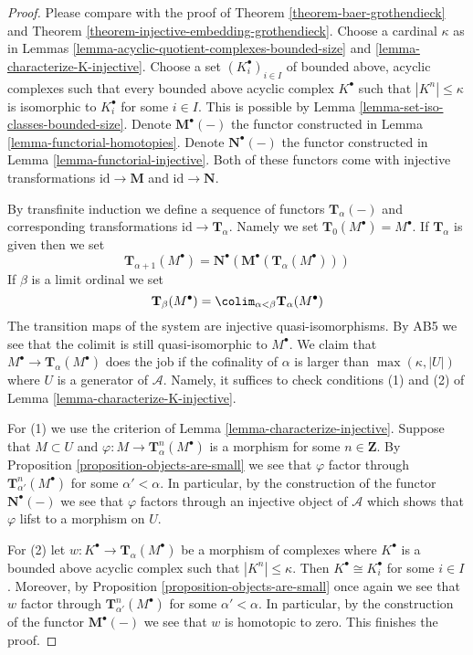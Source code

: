 \begin{proof}
Please compare with the proof of
Theorem \ref{theorem-baer-grothendieck}
and
Theorem \ref{theorem-injective-embedding-grothendieck}.
Choose a cardinal $\kappa$ as in
Lemmas \ref{lemma-acyclic-quotient-complexes-bounded-size} and
\ref{lemma-characterize-K-injective}.
Choose a set $(K_i^\bullet)_{i \in I}$
of bounded above, acyclic complexes
such that every bounded above acyclic complex $K^\bullet$
such that $|K^n| \leq \kappa$ is isomorphic to $K_i^\bullet$ for some
$i \in I$. This is possible by
Lemma \ref{lemma-set-iso-classes-bounded-size}.
Denote $\mathbf{M}^\bullet(-)$ the functor constructed in
Lemma \ref{lemma-functorial-homotopies}.
Denote $\mathbf{N}^\bullet(-)$ the functor constructed in
Lemma \ref{lemma-functorial-injective}.
Both of these functors come with injective transformations
$\text{id} \to \mathbf{M}$ and $\text{id} \to \mathbf{N}$.

\medskip\noindent
By transfinite induction we define a sequence of functors
$\mathbf{T}_\alpha(-)$ and corresponding transformations
$\text{id} \to \mathbf{T}_\alpha$. Namely we set
$\mathbf{T}_0(M^\bullet) = M^\bullet$. If $\mathbf{T}_\alpha$ is
given then we set
$$
\mathbf{T}_{\alpha + 1}(M^\bullet) =
\mathbf{N}^\bullet(\mathbf{M}^\bullet(\mathbf{T}_\alpha(M^\bullet)))
$$
If $\beta$ is a limit ordinal we set
$$
\mathbf{T}_\beta(M^\bullet) =
\colim_{\alpha < \beta} \mathbf{T}_\alpha(M^\bullet)
$$
The transition maps of the system are injective quasi-isomorphisms.
By AB5 we see that the colimit is still quasi-isomorphic to $M^\bullet$.
We claim that $M^\bullet \to \mathbf{T}_\alpha(M^\bullet)$
does the job if the cofinality of $\alpha$ is larger than
$\max(\kappa, |U|)$ where $U$ is a generator of $\mathcal{A}$.
Namely, it suffices to check conditions (1) and (2) of
Lemma \ref{lemma-characterize-K-injective}.

\medskip\noindent
For (1) we use the criterion of
Lemma \ref{lemma-characterize-injective}.
Suppose that $M \subset U$ and $\varphi : M \to \mathbf{T}^n_\alpha(M^\bullet)$
is a morphism for some $n \in \mathbf{Z}$. By
Proposition \ref{proposition-objects-are-small}
we see that $\varphi$ factor through
$\mathbf{T}^n_{\alpha'}(M^\bullet)$ for some $\alpha' < \alpha$.
In particular, by the construction of the functor
$\mathbf{N}^\bullet(-)$ we see that $\varphi$ factors through
an injective object of $\mathcal{A}$ which shows that $\varphi$
lifst to a morphism on $U$.

\medskip\noindent
For (2) let $w : K^\bullet  \to \mathbf{T}_\alpha(M^\bullet)$
be a morphism of complexes where $K^\bullet$ is a bounded above acyclic
complex such that $|K^n| \leq \kappa$. Then $K^\bullet \cong K_i^\bullet$
for some $i \in I$. Moreover, by
Proposition \ref{proposition-objects-are-small}
once again we see that $w$ factor through
$\mathbf{T}^n_{\alpha'}(M^\bullet)$ for some $\alpha' < \alpha$.
In particular, by the construction of the functor
$\mathbf{M}^\bullet(-)$ we see that $w$ is homotopic to zero.
This finishes the proof.
\end{proof}






